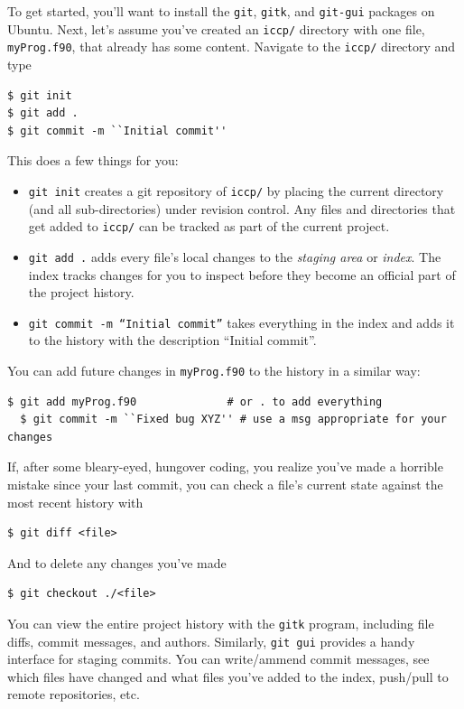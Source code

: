 \documentclass[openany,oneside]{report}
\begin{document}
To get started, you'll want to install the \texttt{git}, \texttt{gitk}, and \texttt{git-gui} packages on Ubuntu. Next, let's assume you've created an \texttt{iccp/} directory with one file, \texttt{myProg.f90}, that already has some content. Navigate to the \texttt{iccp/} directory and type
\begin{verbatim}
$ git init
$ git add .
$ git commit -m ``Initial commit''
\end{verbatim}
This does a few things for you:
\begin{itemize}
  \item \texttt{git init} creates a git repository of \texttt{iccp/} by placing the current directory (and all sub-directories) under revision control.
    Any files and directories that get added to \texttt{iccp/} can be tracked as part of the current project.
  \item \texttt{git add .} adds every file's local changes to the \emph{staging area} or \emph{index}.
    The index tracks changes for you to inspect before they become an official part of the project history.
  \item \texttt{git commit -m ``Initial commit''} takes everything in the index and adds it to the history with the description ``Initial commit''.
\end{itemize}
You can add future changes in \texttt{myProg.f90} to the history in a similar way:
\begin{lstlisting}[style=prompt,nolol]
  $ git add myProg.f90              # or . to add everything
  $ git commit -m ``Fixed bug XYZ'' # use a msg appropriate for your changes
\end{lstlisting}
If, after some bleary-eyed, hungover coding, you realize you've made a horrible mistake since your last commit, you can check a file's current state against the most recent history with
\begin{verbatim}
$ git diff <file>
\end{verbatim}
And to delete any changes you've made
\begin{verbatim}
$ git checkout ./<file>
\end{verbatim}
You can view the entire project history with the \texttt{gitk} program, including file diffs, commit messages, and authors. Similarly, \texttt{git gui} provides a handy interface for staging commits. You can write/ammend commit messages, see which files have changed and what files you've added to the index, push/pull to remote repositories, etc.
\end{document}
